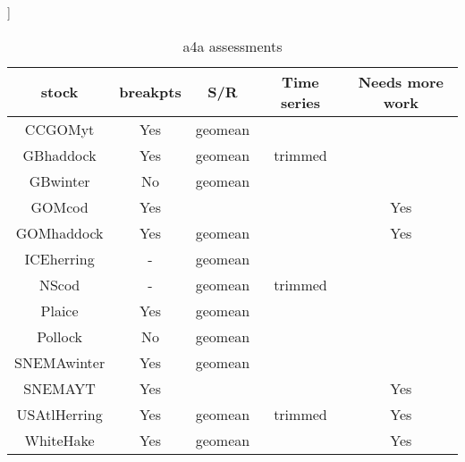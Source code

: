 \documentclass[12pt,letterpaper, leqno]{article}
\begin{document}
\begin{table}
	\begin{center}]
	\begin{tabular}{ccccc}
		\hline 
		stock & breakpts & S/R & Time series & Needs more work \\
		\hline 
		\hline 
		CCGOMyt &  Yes & geomean &  & \\
		GBhaddock & Yes & geomean & trimmed &  \\
		GBwinter & No & geomean &  & \\
		GOMcod & Yes &  &  & Yes \\
		GOMhaddock & Yes & geomean &  & Yes\\
		ICEherring & - & geomean & \\
		NScod & - & geomean & trimmed \\
		Plaice & Yes & geomean & \\
		Pollock & No & geomean &  \\
		SNEMAwinter & Yes & geomean &  \\
		SNEMAYT & Yes &  &  & Yes \\
		USAtlHerring & Yes & geomean & trimmed & Yes \\
		WhiteHake & Yes & geomean &  & Yes \\
		\hline 
	\end{tabular} 
	\caption{a4a assessments}
	\end{center}
\end{table}
\end{document}
